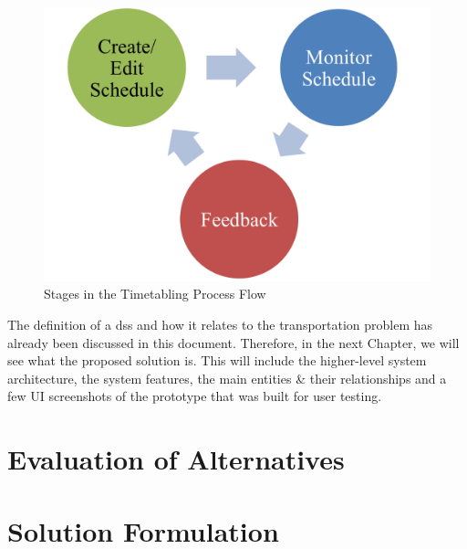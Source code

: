 \begin {figure} [H]
\centering
\includegraphics[scale=0.5]{timetablingProcessSteps}
\caption [Stages in the Timetabling Process Flow] {Stages in the Timetabling Process Flow}
\label {image-timetablingProcessSteps}
\end {figure}

The definition of a \acrshort{dss} and how it relates to the transportation problem has already been discussed in this document. Therefore, in the next Chapter, we will see what the proposed solution is. This will include the higher-level system architecture, the system features, the main entities \& their relationships and a few UI screenshots of the prototype that was built for user testing.



\section{Evaluation of Alternatives}

\paragraph{}



\section{Solution Formulation}

\paragraph{}


